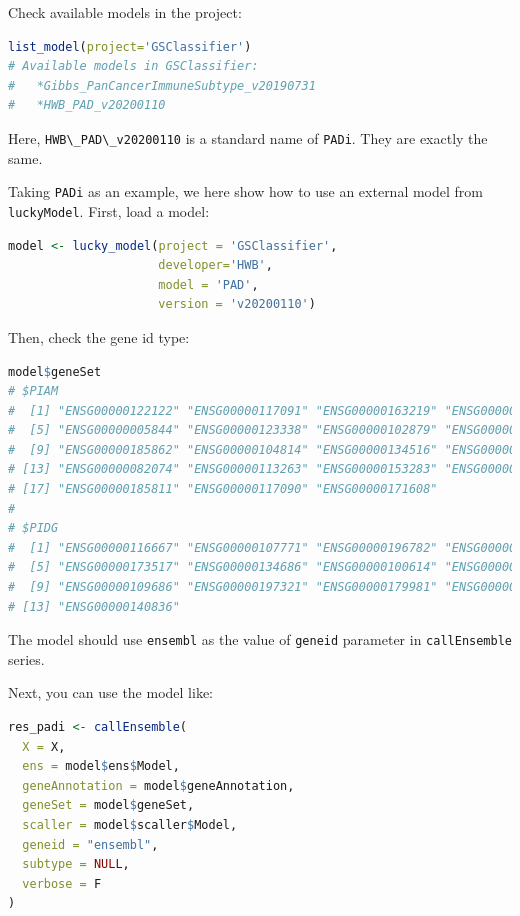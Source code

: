 \documentclass[
  12pt,
]{book}
\newcommand{\passthrough}[1]{#1}
\begin{document}
Check available models in the project:

\begin{lstlisting}[language=R]
list_model(project='GSClassifier')
# Available models in GSClassifier:
#   *Gibbs_PanCancerImmuneSubtype_v20190731
#   *HWB_PAD_v20200110
\end{lstlisting}

Here, \passthrough{\lstinline!HWB\_PAD\_v20200110!} is a standard name of \passthrough{\lstinline!PADi!}. They are exactly the same.

Taking \passthrough{\lstinline!PADi!} as an example, we here show how to use an external model from \passthrough{\lstinline!luckyModel!}. First, load a model:

\begin{lstlisting}[language=R]
model <- lucky_model(project = 'GSClassifier',
                     developer='HWB',
                     model = 'PAD',
                     version = 'v20200110')
\end{lstlisting}

Then, check the gene id type:

\begin{lstlisting}[language=R]
model$geneSet
# $PIAM
#  [1] "ENSG00000122122" "ENSG00000117091" "ENSG00000163219" "ENSG00000136167"
#  [5] "ENSG00000005844" "ENSG00000123338" "ENSG00000102879" "ENSG00000010671"
#  [9] "ENSG00000185862" "ENSG00000104814" "ENSG00000134516" "ENSG00000100055"
# [13] "ENSG00000082074" "ENSG00000113263" "ENSG00000153283" "ENSG00000198821"
# [17] "ENSG00000185811" "ENSG00000117090" "ENSG00000171608"
# 
# $PIDG
#  [1] "ENSG00000116667" "ENSG00000107771" "ENSG00000196782" "ENSG00000271447"
#  [5] "ENSG00000173517" "ENSG00000134686" "ENSG00000100614" "ENSG00000134247"
#  [9] "ENSG00000109686" "ENSG00000197321" "ENSG00000179981" "ENSG00000187189"
# [13] "ENSG00000140836"
\end{lstlisting}

The model should use \passthrough{\lstinline!ensembl!} as the value of \passthrough{\lstinline!geneid!} parameter in \passthrough{\lstinline!callEnsemble!} series.

Next, you can use the model like:

\begin{lstlisting}[language=R]
res_padi <- callEnsemble(
  X = X,
  ens = model$ens$Model,
  geneAnnotation = model$geneAnnotation,
  geneSet = model$geneSet,
  scaller = model$scaller$Model,
  geneid = "ensembl",
  subtype = NULL,
  verbose = F
)
\end{lstlisting}
\end{document}
